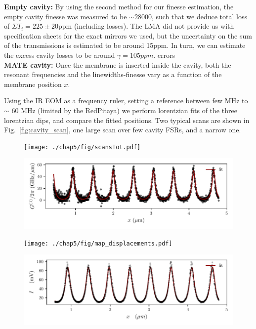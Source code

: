 \noindent \textbf{Empty cavity: }By using the second method for our finesse estimation, the empty cavity finesse was measured to be $\sim 28000$, such that we deduce total loss of $\Sigma T_i = 225 \pm 20$ppm  (including losses). The LMA did not provide us with specification sheets for the exact mirrors we used, but the uncertainty on the sum of the transmissions is estimated to be around 15ppm. In turn, we can estimate the excess cavity losses to be around $\gamma = 105ppm$. \color{red} errors \color{black} \\

\noindent \textbf{MATE cavity: }Once the membrane is inserted inside the cavity, both the resonant frequencies and the linewidths-finesse vary as a function of the membrane position $x$. 


Using the IR EOM as a frequency ruler, setting a reference between few MHz to $\sim$ 60 MHz (limited by the RedPitaya) we perform lorentzian fits of the three lorentzian dips, and compare the fitted positions. Two typical scans are shown in Fig.~\ref{fig:cavity_scan}, one large scan over few cavity FSRs, and a narrow one. \\ 




\begin{figure}[h!]
    \centering  
    \texttt{[image: ./chap5/fig/scansTot.pdf]}
    \caption{ }
    \label{fig:tilt}
\end{figure}

\begin{figure}[h!]
    \centering  
    \includegraphics[width=\textwidth]{./chap5/fig/scancoupling.pdf}
    \caption{ }
    \label{fig:tilt}
\end{figure}
\begin{figure}[h!]
    \centering  
    \texttt{[image: ./chap5/fig/map\_displacements.pdf]}
    \caption{ }
    \label{fig:tilt}
\end{figure}
\begin{figure}[h!]
    \centering  
    \includegraphics[width=\textwidth]{./chap5/fig/scantrans.pdf}
    \caption{ }
    \label{fig:tilt}
\end{figure}


